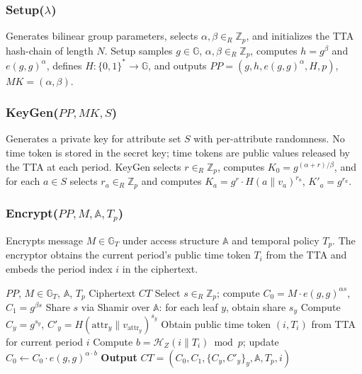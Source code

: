 ﻿\documentclass[lettersize,journal]{IEEEtran}
\begin{document}
\subsubsection{Setup($\lambda$)}

Generates bilinear group parameters, selects $\alpha, \beta \in_R
\mathbb{Z}_p$, and initializes the TTA hash-chain of length $N$.
Setup samples $g \in \mathbb{G}$, $\alpha, \beta \in_R \mathbb{Z}_p$,
computes $h = g^\beta$ and $e(g,g)^\alpha$, defines
$H: \{0,1\}^* \rightarrow \mathbb{G}$, and outputs
$PP = (g, h, e(g,g)^\alpha, H, p)$, $MK = (\alpha, \beta)$.

\subsubsection{KeyGen($PP, MK, S$)}

Generates a private key for attribute set $S$ with per-attribute
randomness. No time token is stored in the secret key; time tokens are
public values released by the TTA at each period.
KeyGen selects $r \in_R \mathbb{Z}_p$, computes
$K_0 = g^{(\alpha+r)/\beta}$, and for each $a \in S$ selects
$r_a \in_R \mathbb{Z}_p$ and computes
$K_a = g^r \cdot H(a \| v_a)^{r_a}$, $K'_a = g^{r_a}$.

\subsubsection{Encrypt($PP, M, \mathbb{A}, T_p$)}

Encrypts message $M \in \mathbb{G}_T$ under access structure
$\mathbb{A}$ and temporal policy $T_p$. The encryptor obtains the
current period's public time token $T_i$ from the TTA and embeds the
period index $i$ in the ciphertext.

\begin{algorithm}[t]
\caption{Encryption}
\label{alg:encryption}
\begin{algorithmic}[1]
\REQUIRE $PP$, $M \in \mathbb{G}_T$, $\mathbb{A}$, $T_p$
\ENSURE Ciphertext $CT$
\STATE Select $s \in_R \mathbb{Z}_p$; compute $C_0 = M \cdot e(g, g)^{\alpha s}$, $C_1 = g^{\beta s}$
\STATE Share $s$ via Shamir over $\mathbb{A}$: for each leaf $y$, obtain share $s_y$
    \STATE Compute $C_y = g^{s_y}$, $C'_y = H(\mathrm{attr}_y \| v_{\mathrm{attr}_y})^{s_y}$
\ENDFOR
\STATE Obtain public time token $(i, T_i)$ from TTA for current period $i$
\STATE Compute $b = \mathcal{H}_Z(i \| T_i) \bmod p$; update $C_0 \leftarrow C_0 \cdot e(g,g)^{\alpha \cdot b}$
\STATE \textbf{Output} $CT = (C_0, C_1, \{C_y, C'_y\}_y, \mathbb{A}, T_p, i)$
\end{algorithmic}
\end{algorithm}
\end{document}
